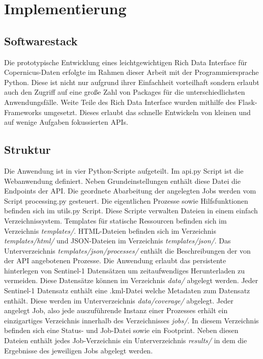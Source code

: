 \newpage
\restoregeometry
\section{Implementierung}
\subsection{Softwarestack}
Die prototypische Entwicklung eines leichtgewichtigen Rich Data Interface für Copernicus-Daten erfolgte im Rahmen dieser Arbeit mit der Programmiersprache Python.
Diese ist nicht nur aufgrund ihrer Einfachheit vorteilhaft sondern erlaubt auch den Zugriff auf eine große Zahl von Packages für die unterschiedlichsten 
Anwendungsfälle. 
Weite Teile des Rich Data Interface wurden mithilfe des Flask-Frameworks umgesetzt. Dieses erlaubt das schnelle Entwickeln von kleinen und auf wenige Aufgaben
fokussierten APIs.   

\subsection{Struktur}
Die Anwendung ist in vier Python-Scripte aufgeteilt. Im api.py Script ist die Webanwendung definiert. Neben Grundeinstellungen enthält diese Datei
die Endpoints der API. Die geordnete Abarbeitung der angelegten Jobs werden vom Script processing.py gesteuert. Die eigentlichen Prozesse sowie 
Hilfsfunktionen befinden sich im utils.py Script.
Diese Scripte verwalten Dateien in einem einfach Verzeichnissystem. Templates für statische Ressourcen befinden sich im Verzeichnis \textit{templates/}. HTML-Dateien 
befinden sich im Verzeichnis \textit{templates/html/} und JSON-Dateien im Verzeichnis \textit{templates/json/}. Das Unterverzeichnis \textit{templates/json/processes/} enthält die 
Beschreibungen der von der API angebotenen Prozesse. 
Die Anwendung erlaubt das persistente hinterlegen von Sentinel-1 Datensätzen um zeitaufwendiges Herunterladen zu vermeiden. Diese Datensätze können im Verzeichnis \textit{data/} abgelegt werden. Jeder Sentinel-1 Datensatz enthält eine .kml-Datei welche 
Metadaten zum Datensatz enthält. Diese werden im Unterverzeichnis \textit{data/coverage/} abgelegt. 
Jeder angelegt Job, also jede auszuführende Instanz einer Prozesses erhält ein einzigartiges Verzeichnis innerhalb des Verzeichnisses \textit{jobs/}. In diesem 
Verzeichnis befinden sich eine Status- und Job-Datei sowie ein Footprint. Neben diesen Dateien enthält jedes Job-Verzeichnis ein Unterverzeichnis \textit{results/} in dem
die Ergebnisse des jeweiligen Jobs abgelegt werden.  

